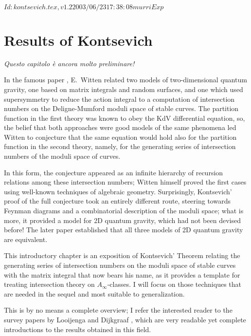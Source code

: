 \RCSID $Id: kontsevich.tex,v 1.2 2003/06/23 17:38:08 murri Exp $


\chapter{Results of Kontsevich}
\label{cha:kontsevich}

{\Large\itshape Questo capitolo {\`e} ancora \emph{molto} preliminare!}

In the famous paper \cite{witten;intersection-theory}, E.~Witten
related two models of two-dimensional quantum gravity, one based on
matrix integrals and random surfaces, and one which used supersymmetry
to reduce the action integral to a computation of intersection numbers
on the Deligne-Mumford moduli space of stable curves. The partition
function in the first theory was known to obey the KdV differential
equation, so, the belief that both approaches were good models of the
same phenomena led Witten to conjecture that the same equation would
hold also for the partition function in the second theory, namely, for
the generating series of intersection numbers of the moduli space of
curves.

In this form, the conjecture appeared as an infinite hierarchy of
recursion relations among these intersection numbers; Witten himself
proved the first cases using well-known techniques of algebraic
geometry.  Surprisingly, Kontsevich' proof of the full conjecture took
an entirely different route, steering towards Feynman diagrams and a
combinatorial description of the moduli space; what is more, it
provided a model for 2D quantum gravity, which had not been devised
before!  The later paper \cite{witten;kontsevich-model} established
that all three models of 2D quantum gravity are equivalent.

This introductory chapter is an exposition of Kontsevich' Theorem
relating the generating series of intersection numbers on the moduli
space of stable curves with the matrix integral that now bears his
name, as it provides a template for treating intersection theory on
$A_\infty$-classes. I will focus on those techniques that are needed in
the sequel and most suitable to generalization.

This is by no means a complete overview; I refer the interested reader
to the survey papers by Looijenga \cite{looijenga;intersection-theory}
and Dijkgraaf \cite{dijkgraaf;intersection-theory}, which are very
readable yet complete introductions to the results obtained in this
field.



